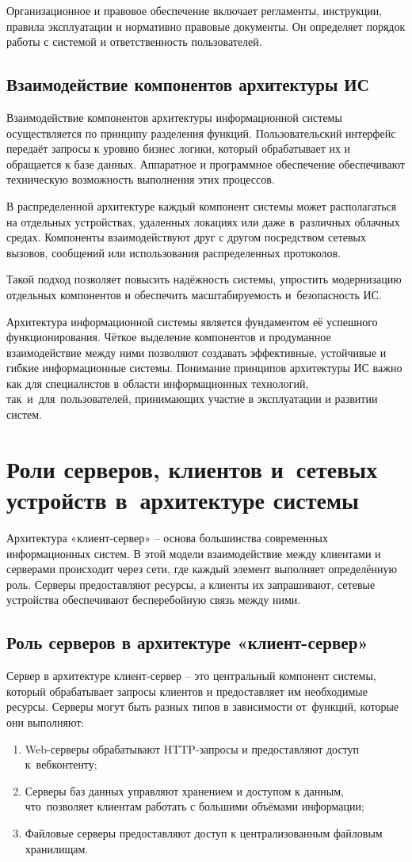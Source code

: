 \documentclass{ou}
\begin{document}
Организационное и правовое обеспечение включает регламенты, инструкции, правила эксплуатации и нормативно правовые документы. Он определяет порядок работы с системой и ответственность пользователей.
\subsection{Взаимодействие компонентов архитектуры ИС}
Взаимодействие компонентов архитектуры информационной системы осуществляется по принципу разделения функций. Пользовательский интерфейс передаёт запросы к уровню бизнес логики, который обрабатывает их и обращается к базе данных. Аппаратное и программное обеспечение обеспечивают техническую возможность выполнения этих процессов.

В распределенной архитектуре каждый компонент системы может располагаться на отдельных устройствах, удаленных локациях или даже в~различных облачных средах. Компоненты взаимодействуют друг с другом посредством сетевых вызовов, сообщений или использования распределенных протоколов\cite{ifmo2024}.

Такой подход позволяет повысить надёжность системы, упростить модернизацию отдельных компонентов и обеспечить масштабируемость и~безопасность ИС\cite{irgups2025}.

Архитектура информационной системы является фундаментом её успешного функционирования. Чёткое выделение компонентов и продуманное взаимодействие между ними позволяют создавать эффективные, устойчивые и гибкие информационные системы. Понимание принципов архитектуры ИС важно как для специалистов в области информационных технологий, так~и~для~пользователей, принимающих участие в эксплуатации и развитии систем.
\newpage
\section{Роли серверов, клиентов и~сетевых устройств в~архитектуре системы}
Архитектура «клиент-сервер» -- основа большинства современных
информационных систем. В этой модели взаимодействие между клиентами и
серверами происходит через сети, где каждый элемент выполняет определённую
роль. Серверы предоставляют ресурсы, а клиенты их запрашивают, сетевые
устройства обеспечивают бесперебойную связь между ними.
\subsection{Роль серверов в архитектуре «клиент-сервер»}
Сервер в архитектуре клиент-сервер -- это центральный компонент системы,
который обрабатывает запросы клиентов и предоставляет им необходимые
ресурсы. Серверы могут быть разных типов в зависимости от~функций,
которые они выполняют:
\begin{enumerate}[leftmargin=0em, itemindent=3.75em, nosep, label=\arabic*)]
\item Web-серверы обрабатывают HTTP-запросы и предоставляют доступ к~вебконтенту;
\item Серверы баз данных управляют хранением и доступом к данным, что~позволяет
клиентам работать с большими объёмами информации;
\item Файловые серверы предоставляют доступ к централизованным файловым
хранилищам.
\end{enumerate}
\end{document}
